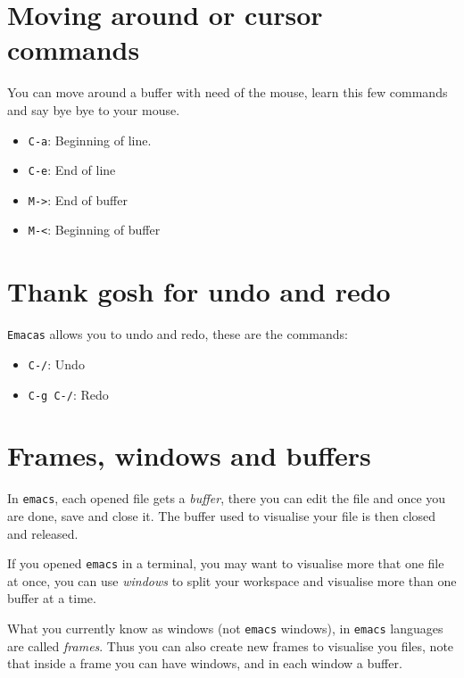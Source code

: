 \documentclass[12pt,a4paper,final]{article} %
\begin{document}
\section{Moving around or cursor commands}
You can move around a buffer with need of the mouse, learn this few
commands and say bye bye to your mouse.
\begin{itemize}
\item \texttt{C-a}: Beginning of line.
\item \texttt{C-e}: End of line
\item \texttt{M->}: End of buffer
\item \texttt{M-<}: Beginning of buffer
\end{itemize}

\section{Thank gosh for undo and redo}
\texttt{Emacas} allows you to undo and redo, these are the commands:
\begin{itemize}
\item \texttt{C-/}: Undo
\item \texttt{C-g C-/}: Redo
\end{itemize}

\section{Frames, windows and buffers}
In \texttt{emacs}, each opened file gets a \textit{buffer}, there you
can edit the file and once you are done, save and close it. The buffer
used to visualise your file is then closed and released.

If you opened \texttt{emacs} in a terminal, you may want to visualise
more that one file at once, you can use \textit{windows} to split your
workspace and visualise more than one buffer at a time.

What you currently know as windows (not \texttt{emacs} windows), in
\texttt{emacs} languages are called \textit{frames}. Thus you can also
create new frames to visualise you files, note that inside a frame you
can have windows, and in each window a buffer.
\end{document}
